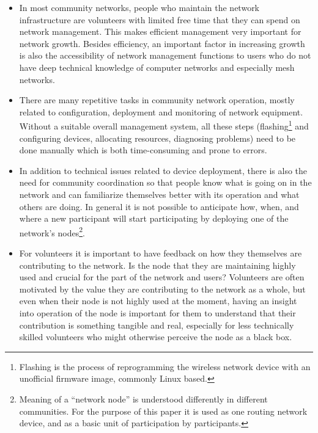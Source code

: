 \documentclass[5p,sort&compress]{elsarticle}
\begin{document}
\begin{itemize}
\item In most community networks, people who maintain the network infrastructure are volunteers with limited free time that they can spend on network management.
This makes efficient management very important for network growth.
Besides efficiency, an important factor in increasing growth is also the accessibility of network management functions to users who do not have deep technical knowledge of computer networks and especially mesh networks.

\item There are many repetitive tasks in community network operation, mostly related to configuration, deployment and monitoring of network equipment.
Without a suitable overall management system, all these steps (flashing\footnote{Flashing is the process of reprogramming the wireless network device with an unofficial firmware image, commonly Linux based.} and configuring devices, allocating resources, diagnosing problems) need to be done manually which is both time-consuming and prone to errors.

\item In addition to technical issues related to device deployment, there is also the need for community coordination so that people know what is going on in the network and can familiarize themselves better with its operation and what others are doing.
In general it is not possible to anticipate how, when, and where a new participant will start participating by deploying one of the network's nodes\footnote{Meaning of a ``network node'' is understood differently in different communities. For the purpose of this paper it is used as one routing network device, and as a basic unit of participation by participants.}.

\item For volunteers it is important to have feedback on how they themselves are contributing to the network.
Is the node that they are maintaining highly used and crucial for the part of the network and users?
Volunteers are often motivated by the value they are contributing to the network as a whole, but even when their node is not highly used at the moment, having an insight into operation of the node is important for them to understand that their contribution is something tangible and real, especially for less technically skilled volunteers who might otherwise perceive the node as a black box.
\end{itemize}
\end{document}
